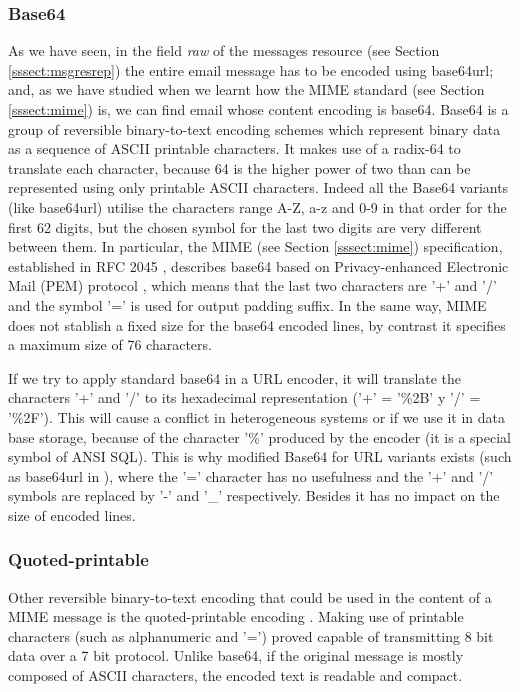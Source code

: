 \subsubsection{Base64} \label{sssect:base64}
As we have seen, in the field \textit{raw} of the messages resource (see Section \ref{sssect:msgresrep}) the entire email message has to be encoded using base64url; and, as we have studied when we learnt how the MIME standard (see Section \ref{sssect:mime}) is, we can find email whose content encoding is base64. Base64 \citep{wikibase64, rfc4648} is a group of reversible binary-to-text encoding schemes which represent binary data as a sequence of ASCII printable characters. It makes use of a radix-64 to translate each character, because 64 is the higher power of two than can be represented using only printable ASCII characters. Indeed all the Base64 variants (like base64url) utilise the characters range A-Z, a-z and 0-9 in that order for the first 62 digits, but the chosen symbol for the last two digits are very different between them. In particular, the MIME (see Section \ref{sssect:mime}) specification, established in RFC 2045 \citep{rfc2045}, describes base64 based on  Privacy-enhanced Electronic Mail (PEM) protocol \citep{wikipem, rfc7468}, which means that the last two characters are '+' and '/' and the symbol '=' is used for output padding suffix. In the same way, MIME does not stablish a fixed size for the base64 encoded lines, by contrast it specifies a maximum size of 76 characters.

If we try to apply standard base64 in a URL encoder, it will translate the characters '+' and '/' to its hexadecimal representation ('+' = '\%2B' y '/' = '\%2F'). This will cause a conflict in heterogeneous systems or if we use it in data base storage, because of the character '\%' produced by the encoder (it is a special symbol of ANSI SQL). This is why modified Base64 for URL variants exists (such as base64url in \cite{rfc4648}), where the '=' character has no usefulness and the '+' and '/' symbols are replaced by '-' and '\_' respectively. Besides it has no impact on the size of encoded lines.

\subsubsection{Quoted-printable} \label{sssect:quot-p}
Other reversible binary-to-text encoding that could be used in the content of a MIME message is the quoted-printable encoding \citep{wikiquotprint, rfc1521}. Making use of printable characters (such as alphanumeric and '=') proved capable of transmitting 8 bit data over a 7 bit protocol. Unlike base64, if the original message is mostly composed of ASCII characters, the encoded text is readable and compact.

